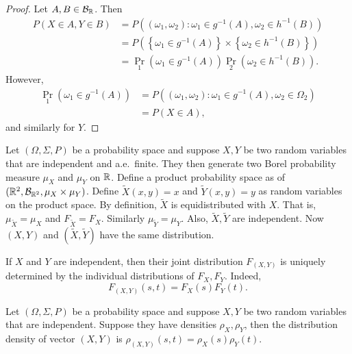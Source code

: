 \documentclass[a4paper]{article}
\begin{document}
\begin{proof}
  Let $A, B \in \mathcal{B}_{\mathbb{R}}$. Then
  \begin{align*}
    P \left( X \in A, Y \in B \right)
    &= P \left( (\omega_1, \omega_2) : \omega_1 \in g^{-1} (A),
    \omega_2 \in h^{-1} (B) \right) \\
    &= P \left( \left\{ \omega_1 \in g^{-1} (A) \right\} \times
    \left\{ \omega_2 \in h^{-1} (B) \right\} \right) \\
    &= \Pr_1 \left( \omega_1 \in g^{-1} (A) \right)
    \Pr_2 \left( \omega_2 \in h^{-1} (B) \right).
  \end{align*}
  However,
  \begin{align*}
    \Pr_1 \left( \omega_1 \in g^{-1} (A) \right)
    &= P \left( (\omega_1, \omega_2) : \omega_1 \in g^{-1} (A),
    \omega_2 \in \Omega_2 \right) \\
    &= P \left( X \in A \right),
  \end{align*}
  and similarly for $Y$.

\end{proof}

\begin{remark}
  Let $(\Omega, \Sigma, P)$ be a probability space and suppose
  $X, Y$ be two random variables that are independent and
  a.e.\ finite.
  They then generate two Borel probability measure $\mu_X$ and
  $\mu_Y$ on $\mathbb{R}$.
  Define a product probability space as
  of $(\mathbb{R}^2, \mathcal{B}_{\mathbb{R}^2}, \mu_X \times \mu_Y)$. Define
  $\tilde{X} (x, y) = x$ and $\tilde{Y} (x, y) = y$ as random
  variables on the product space. By definition,
  $\tilde{X}$ is equidistributed with $X$. That is, $\mu_{\tilde{X}} = \mu_X$
  and $F_{\tilde{X}} = F_X$. Similarly $\mu_{\tilde{Y}} = \mu_Y$.
  Also, $\tilde{X}, \tilde{Y}$ are independent. Now
  $(X, Y)$ and $(\tilde{X}, \tilde{Y})$ have the same distribution.
\end{remark}

\begin{remark}
  If $X$ and $Y$ are independent, then their joint distribution
  $F_{(X, Y)}$ is uniquely determined by the individual distributions
  of $F_X, F_Y$. Indeed,
  \[
  F_{(X, Y)} (s, t) = F_X (s) F_Y (t).
  \]
\end{remark}

\begin{remark}
  Let $(\Omega, \Sigma, P)$ be a probability space and suppose
  $X, Y$ be two random variables that are independent. Suppose they have
  densities $\rho_X, \rho_Y$, then the distribution density of
  vector $(X, Y)$ is $\rho_{(X, Y)} (s, t) = \rho_X (s) \rho_Y (t)$.
\end{remark}
\end{document}
